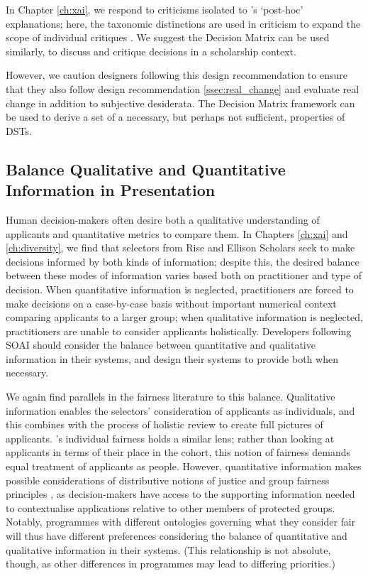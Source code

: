 In Chapter \ref{ch:xai}, we respond to criticisms isolated to \textcite{friedrich_taxonomy_2011}'s `post-hoc' explanations; here, the taxonomic distinctions are used in criticism to expand the scope of individual critiques \cite{barocas_hidden_2020,kumar_problems_2020}. We suggest the Decision Matrix can be used similarly, to discuss and critique decisions in a scholarship context.

However, we caution designers following this design recommendation to ensure that they also follow design recommendation \ref{ssec:real_change} and evaluate real change in addition to subjective desiderata. The Decision Matrix framework can be used to derive a set of a necessary, but perhaps not sufficient, properties of DSTs.

\subsection{Balance Qualitative and Quantitative Information in Presentation}
Human decision-makers often desire both a qualitative understanding of applicants and quantitative metrics to compare them. In Chapters \ref{ch:xai} and \ref{ch:diversity}, we find that selectors from Rise and Ellison Scholars seek to make decisions informed by both kinds of information; despite this, the desired balance between these modes of information varies based both on practitioner and type of decision. When quantitative information is neglected, practitioners are forced to make decisions on a case-by-case basis without important numerical context comparing applicants to a larger group; when qualitative information is neglected, practitioners are unable to consider applicants holistically. Developers following SOAI should consider the balance between quantitative and qualitative information in their systems, and design their systems to provide both when necessary.

We again find parallels in the fairness literature to this balance. Qualitative information enables the selectors' consideration of applicants as individuals, and this combines with the process of holistic review to create full pictures of applicants. \cite{dwork_fairness_2012}'s individual fairness holds a similar lens; rather than looking at applicants in terms of their place in the cohort, this notion of fairness demands equal treatment of applicants as people. However, quantitative information makes possible considerations of distributive notions of justice and group fairness principles \cite{Olsaretti_2018}, as decision-makers have access to the supporting information needed to contextualise applications relative to other members of protected groups. Notably, programmes with different ontologies governing what they consider fair will thus have different preferences considering the balance of quantitative and qualitative information in their systems. (This relationship is not absolute, though, as other differences in programmes may lead to differing priorities.)

